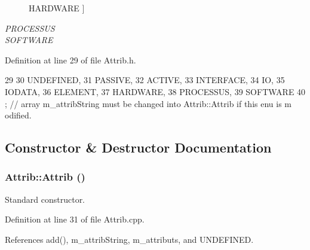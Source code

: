 \begin{Desc}
\begin{description}
{\hypertarget{classAttrib_a69e171d7cc6417835a5a306d3c764235a61ceb22149f365f1780d18f9d1459423}{
HARDWARE}
\label{classAttrib_a69e171d7cc6417835a5a306d3c764235a61ceb22149f365f1780d18f9d1459423}
}]\item[{\em 
\hypertarget{classAttrib_a69e171d7cc6417835a5a306d3c764235a75250e29692496e73effca2c0330977f}{
PROCESSUS}
\label{classAttrib_a69e171d7cc6417835a5a306d3c764235a75250e29692496e73effca2c0330977f}
}]\item[{\em 
\hypertarget{classAttrib_a69e171d7cc6417835a5a306d3c764235a103a67cd0b8f07ef478fa45d4356e27b}{
SOFTWARE}
\label{classAttrib_a69e171d7cc6417835a5a306d3c764235a103a67cd0b8f07ef478fa45d4356e27b}
}]\end{description}
\end{Desc}



Definition at line 29 of file Attrib.h.


\begin{DoxyCode}
29                 {
30     UNDEFINED,
31     PASSIVE,
32     ACTIVE,
33     INTERFACE,
34     IO,
35     IODATA,
36     ELEMENT,
37     HARDWARE,
38     PROCESSUS,
39     SOFTWARE 
40   }; // array m_attribString must be changed into Attrib::Attrib if this enu is m
      odified. 
\end{DoxyCode}


\subsection{Constructor \& Destructor Documentation}
\hypertarget{classAttrib_ae76863db250b64f2779eb11acc5ebe18}{
\subsubsection[{Attrib}]{\setlength{\rightskip}{0pt plus 5cm}Attrib::Attrib ()}}
\label{classAttrib_ae76863db250b64f2779eb11acc5ebe18}


Standard constructor. 

Definition at line 31 of file Attrib.cpp.

References add(), m\_\-attribString, m\_\-attributs, and UNDEFINED.


